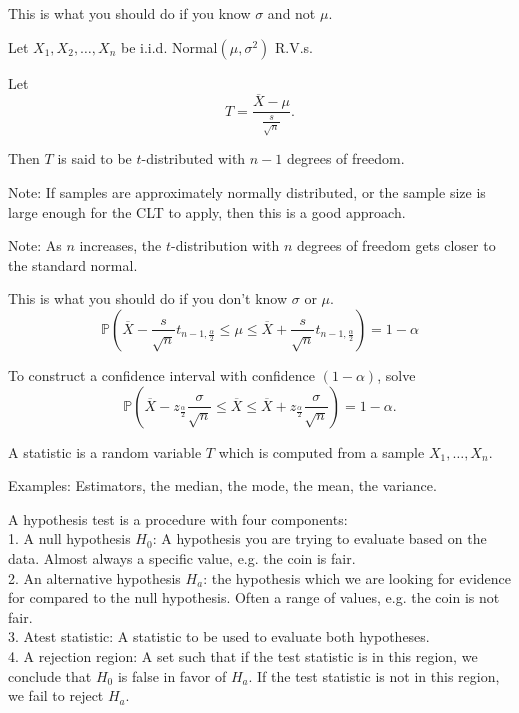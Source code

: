 \documentclass{article}
\begin{document}
    This is what you should do if you know $\sigma$ and not $\mu$.

\medskip
{}

    Let $X_1, X_2, \hdots, X_n$ be i.i.d. Normal$(\mu, \sigma^2)$ R.V.s.

    Let $$T = \frac{\overline X - \mu}{\frac s{\sqrt n}}.$$

    Then $T$ is said to be $t$-distributed with $n-1$ degrees of freedom.

    Note: If samples are approximately normally distributed, or the sample size is large enough for the CLT to apply, then this is a good approach.

    Note: As $n$ increases, the $t$-distribution with $n$ degrees of freedom gets closer to the standard normal.

\medskip
{}

    This is what you should do if you don't know $\sigma$ or $\mu$.
    $$\mathbb P\left(\overline X - \frac s{\sqrt n} t_{n-1, \frac\alpha2} \leq \mu \leq \overline X + \frac s{\sqrt n} t_{n-1, \frac\alpha2}\right) = 1 - \alpha$$

    To construct a confidence interval with confidence $(1-\alpha)$, solve
    \[\mathbb P\left(\overline X - z_{\frac\alpha2}\frac\sigma{\sqrt n} \leq \overline X \leq \overline X + z_{\frac\alpha2}\frac\sigma{\sqrt n}\right) = 1 - \alpha.\]

\medskip
{}

    A statistic is a random variable $T$ which is computed from a sample $X_1, \hdots, X_n$.

    Examples: Estimators, the median, the mode, the mean, the variance.

\medskip
{}

    A hypothesis test is a procedure with four components: \\
    1. A null hypothesis $H_0$: A hypothesis you are trying to evaluate based on the data. Almost always a specific value, e.g. the coin is fair. \\
    2. An alternative hypothesis $H_a$: the hypothesis which we are looking for evidence for compared to the null hypothesis. Often a range of values, e.g. the coin is not fair. \\
    3. Atest statistic: A statistic to be used to evaluate both hypotheses. \\
    4. A rejection region: A set such that if the test statistic is in this region, we conclude that $H_0$ is false in favor of $H_a$. If the test statistic is not in this region, we fail to reject $H_a$.
\end{document}
